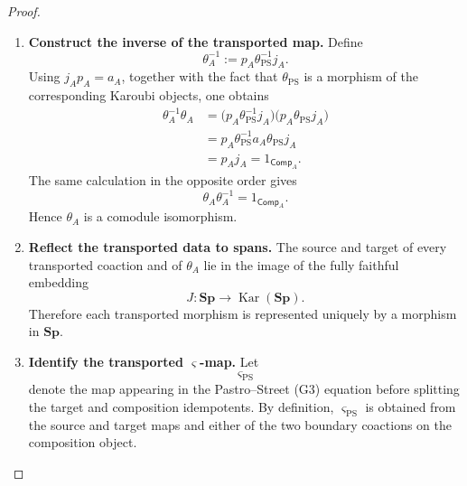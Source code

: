 \documentclass[oneside]{article}
\newcommand{\Sp}{\mathbf{Sp}}
\newcommand{\Kar}{\operatorname{Kar}}
\theoremstyle{plain}
\theoremstyle{definition}
\theoremstyle{remark}
\begin{document}
\begin{proof}
\begin{enumerate}[beginpenalty=10000]
        \item \textbf{Construct the inverse of the transported map.} Define
        \[
            \theta_A^{-1}
            :=
            p_A\theta_{\mathrm{PS}}^{-1}j_A.
        \]
        Using \(j_Ap_A=a_A\), together with the fact that \(\theta_{\mathrm{PS}}\) is a morphism of the corresponding Karoubi objects, one obtains
        \begin{align*}
            \theta_A^{-1}\theta_A
            &=
            \bigl(
                p_A\theta_{\mathrm{PS}}^{-1}j_A
            \bigr)
            \bigl(
                p_A\theta_{\mathrm{PS}}j_A
            \bigr)
            \\
            &=
            p_A\theta_{\mathrm{PS}}^{-1}
            a_A
            \theta_{\mathrm{PS}}j_A
            \\
            &=
            p_Aj_A
            =
            1_{\mathsf{Comp}_A}.
        \end{align*}
        The same calculation in the opposite order gives
        \[
            \theta_A\theta_A^{-1}
            =
            1_{\mathsf{Comp}_A}.
        \]
        Hence \(\theta_A\) is a comodule isomorphism.

        \item \textbf{Reflect the transported data to spans.} The source and target of every transported coaction and of \(\theta_A\) lie in the image of the fully faithful embedding
        \[
            J:\Sp\longrightarrow\Kar(\Sp).
        \]
        Therefore each transported morphism is represented uniquely by a morphism in \(\Sp\).

        \item \textbf{Identify the transported \(\varsigma\)-map.} Let
        \[
            \varsigma_{\mathrm{PS}}
        \]
        denote the map appearing in the Pastro--Street \textup{(G3)} equation before splitting the target and composition idempotents. By definition, \(\varsigma_{\mathrm{PS}}\) is obtained from the source and target maps and either of the two boundary coactions on the composition object.


\end{enumerate}
\end{proof}
\end{document}
